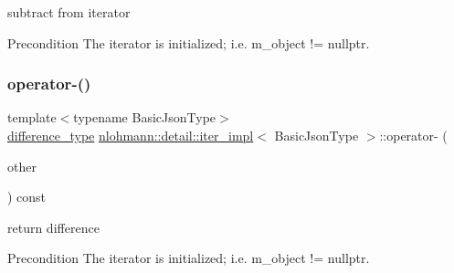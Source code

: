 subtract from iterator 

\begin{DoxyPrecond}{Precondition}
The iterator is initialized; i.\+e. {\ttfamily m\+\_\+object != nullptr}. 
\end{DoxyPrecond}
\mbox{\label{classnlohmann_1_1detail_1_1iter__impl_a49bf3e708a9c1c88c415011735962d06}} 
\subsubsection{\texorpdfstring{operator-\/()}{operator-()}\hspace{0.1cm}{\footnotesize\ttfamily [2/2]}}
{\footnotesize\ttfamily template$<$typename Basic\+Json\+Type$>$ \\
\mbox{\hyperlink{classnlohmann_1_1detail_1_1iter__impl_a2f7ea9f7022850809c60fc3263775840}{difference\+\_\+type}} \mbox{\hyperlink{classnlohmann_1_1detail_1_1iter__impl}{nlohmann\+::detail\+::iter\+\_\+impl}}$<$ Basic\+Json\+Type $>$\+::operator-\/ (\begin{DoxyParamCaption}\item[{const \mbox{\hyperlink{classnlohmann_1_1detail_1_1iter__impl}{iter\+\_\+impl}}$<$ Basic\+Json\+Type $>$ \&}]{other }\end{DoxyParamCaption}) const\hspace{0.3cm}{\ttfamily [inline]}}



return difference 

\begin{DoxyPrecond}{Precondition}
The iterator is initialized; i.\+e. {\ttfamily m\+\_\+object != nullptr}. 
\end{DoxyPrecond}
\mbox{\label{classnlohmann_1_1detail_1_1iter__impl_a1fc43e764467b8ea4a4cdd01f629d757}} 

